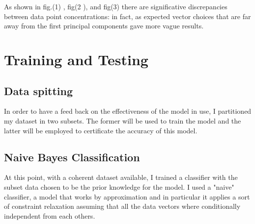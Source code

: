 \documentclass{article}
\begin{document}
As shown in fig.(1) , fig(2 ), and fig(3) there are significative discrepancies between data point concentrations:  in fact, as expected vector choices that are far away from the first principal components gave more vague results.
				\section{Training and Testing}
				\subsection{Data spitting}
				In order to have a feed back on the effectiveness of the model in use, I partitioned my dataset in two subsets. The former will be used to train the model and the latter will be employed to certificate the accuracy of this model. 
				\subsection{Naive Bayes Classification}
				At this point, with a coherent dataset available, I trained a classifier with the subset data chosen to be the prior knowledge for the model. I used a "naive" classifier, a model that works by approximation and in particular it applies a sort of constraint relaxation assuming that all the data vectors where conditionally independent from each others.
\end{document}
